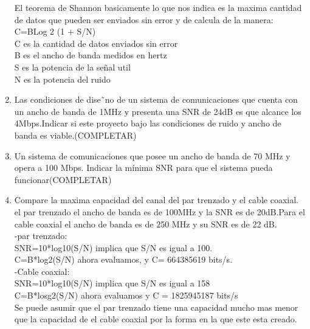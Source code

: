 \documentclass{udparticle}
\begin{document}
\begin{enumerate}
    El teorema de Shannon basicamente lo que nos indica es la maxima cantidad de datos que pueden ser enviados sin error y de calcula de la manera:\\
            C=BLog 2 (1 + S/N)\\
            C es la cantidad de datos enviados sin error\\
            B es el ancho de banda medidos en hertz\\
            S es la potencia de la señal util\\
            N es la potencia del ruido\\
    \item  Las condiciones de dise˜no de un sistema de comunicaciones que cuenta con un ancho de banda de 1MHz y presenta una SNR de 24dB es que alcance los 4Mbps.Indicar si este proyecto bajo las condiciones de ruido y ancho de banda es viable.(COMPLETAR) \\
    \item Un sistema de comunicaciones que posee un ancho de banda de 70 MHz y opera a 100 Mbps. Indicar la mínima SNR para que el sistema pueda funcionar(COMPLETAR) \\
    \item  Compare la maxima capacidad del canal del par trenzado y el cable coaxial. el par trenzado el ancho de banda es de 100MHz y la SNR es de 20dB.Para el cable coaxial el ancho de banda es de 250 MHz y su SNR es de 22 dB.\\
    	-par trenzado:\\
    		SNR=10*log10(S/N) implica que S/N es igual a 100.\\
    		C=B*log2(S/N) ahora evaluamos, y C= 664385619 bits/s.\\
    	-Cable coaxial:\\
    		SNR=10*log10(S/N) implica que S/N es igual a 158  \\
    		C=B*losg2(S/N) ahora evaluamos y C = 1825945187 bits/s\\
    	Se puede asumir que el par trenzado tiene una capacidad mucho mas menor que la capacidad de el cable coaxial por la forma
    	en la que este esta creado.\\
    

\end{enumerate}
\end{document}
